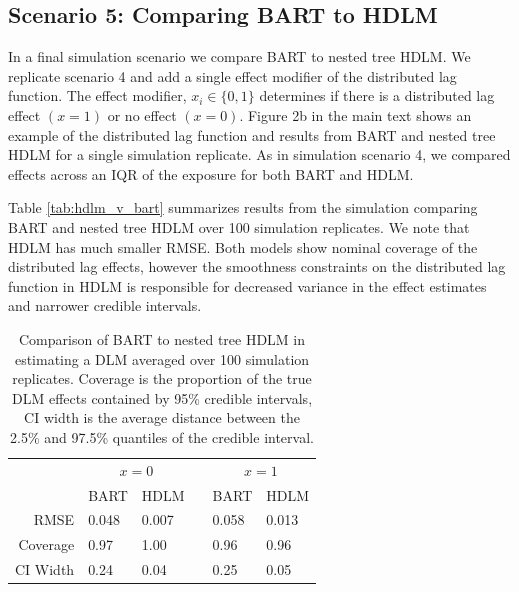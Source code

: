 \documentclass[12pt]{article}
\begin{document}
\subsection{Scenario 5: Comparing BART to HDLM}
In a final simulation scenario we compare BART to nested tree HDLM. We replicate scenario 4 and add a single effect modifier of the distributed lag function. The effect modifier, $x_i\in\{0,1\}$ determines if there is a distributed lag effect $(x=1)$ or no effect $(x=0)$. Figure 2b in the main text shows an example of the distributed lag function and results from BART and nested tree HDLM for a single simulation replicate. As in simulation scenario 4, we compared effects across an IQR of the exposure for both BART and HDLM.

Table \ref{tab:hdlm_v_bart} summarizes results from the simulation comparing BART and nested tree HDLM over 100 simulation replicates. We note that HDLM has much smaller RMSE. Both models show nominal coverage of the distributed lag effects, however the smoothness constraints on the distributed lag function in HDLM is responsible for decreased variance in the effect estimates and narrower credible intervals.


\begin{table}[!ht]
    \caption{Comparison of BART to nested tree HDLM in estimating a DLM averaged over 100 simulation replicates. Coverage is the proportion of the true DLM effects contained by 95\% credible intervals, CI width is the average distance between the 2.5\% and 97.5\% quantiles of the credible interval.}
    \label{tab:tdlm_v_bart}
    \centering
    \begin{tabular}{rllcll}
    \toprule[2pt]
            & \multicolumn{2}{c}{$x=0$} && \multicolumn{2}{c}{$x=1$}\\
            & BART & HDLM && BART & HDLM \\
            \cmidrule{2-3}\cmidrule{5-6}
         RMSE & 0.048&0.007&&0.058&0.013\\
         Coverage & 0.97&1.00&&0.96&0.96\\
         CI Width & 0.24&0.04&&0.25&0.05\\
         \bottomrule[2pt]
    \end{tabular}
\end{table}
\end{document}
